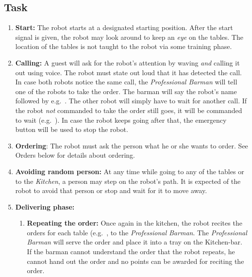 \subsection{Task}
\begin{enumerate}
	\item \textbf{Start:} The robot starts at a designated starting position. After the start signal is given, the robot may look around to keep an \textit{eye} on the tables.
	  The location of the tables is not taught to the robot via some training phase.

	\item \textbf{Calling:} A guest will ask for the robot's attention by waving \emph{and} calling it out using voice.
	  The robot must state out loud that it has detected the call.
	  In case both robots notice the same call, the \textit{Professional Barman} will tell one of the robots to take the order.
	  The barman will say the robot's name followed by  e.g.~.
	  The other robot will simply have to wait for another call.
	  If the robot \textit{not} commanded to take the order still goes, it will be commanded to wait (e.g.~).
	  In case the robot keeps going after that, the emergency button will be used to stop the robot.


	\item \textbf{Ordering}: The robot must ask the person what he or she wants to order. See Orders below for details about ordering.
	\item \textbf{Avoiding random person:} At any time while going to any of the tables or to the \textit{Kitchen}, a person may step on the robot's path.
	  It is expected of the robot to avoid that person or stop and wait for it to move away.

	\item \textbf{Delivering phase:}
	\begin{enumerate}
		\item \textbf{Repeating the order:} Once again in the kitchen, the robot recites the orders for each table (e.g.~\textit{}, to the \textit{Professional Barman}.
		  The \textit{Professional Barman} will serve the order and place it into a tray on the Kitchen-bar.
		  If the barman cannot understand the order that the robot repeats, he cannot hand out the order and no points can be awarded for reciting the order.


\end{enumerate}
\end{enumerate}
